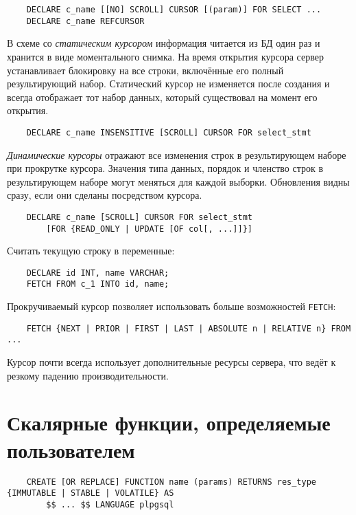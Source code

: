 \begin{verbatim}
	DECLARE c_name [[NO] SCROLL] CURSOR [(param)] FOR SELECT ...
	DECLARE c_name REFCURSOR
\end{verbatim}

В схеме со \emph{статическим курсором} информация читается из БД один раз и хранится в виде моментального снимка.
На время открытия курсора сервер устанавливает блокировку на все строки, включённые его полный результирующий набор.
Статический курсор не изменяется после создания и всегда отображает тот набор данных, который существовал на момент его открытия.

\begin{verbatim}
	DECLARE c_name INSENSITIVE [SCROLL] CURSOR FOR select_stmt
\end{verbatim}

\emph{Динамические курсоры} отражают все изменения строк в результирующем наборе при прокрутке курсора.
Значения типа данных, порядок и членство строк в результирующем наборе могут меняться для каждой выборки.
Обновления видны сразу, если они сделаны посредством курсора.

\begin{verbatim}
	DECLARE c_name [SCROLL] CURSOR FOR select_stmt
		[FOR {READ_ONLY | UPDATE [OF col[, ...]]}]
\end{verbatim}

Считать текущую строку в переменные:
\begin{verbatim}
	DECLARE id INT, name VARCHAR;
	FETCH FROM c_1 INTO id, name;
\end{verbatim}

Прокручиваемый курсор позволяет использовать больше возможностей \texttt{FETCH}:
\begin{verbatim}
	FETCH {NEXT | PRIOR | FIRST | LAST | ABSOLUTE n | RELATIVE n} FROM ...
\end{verbatim}

\begin{remark}
	Курсор почти всегда использует дополнительные ресурсы сервера, что ведёт к резкому падению производительности.
\end{remark}

\section{Скалярные функции, определяемые пользователем}

\begin{verbatim}
	CREATE [OR REPLACE] FUNCTION name (params) RETURNS res_type {IMMUTABLE | STABLE | VOLATILE} AS
		$$ ... $$ LANGUAGE plpgsql
\end{verbatim}

